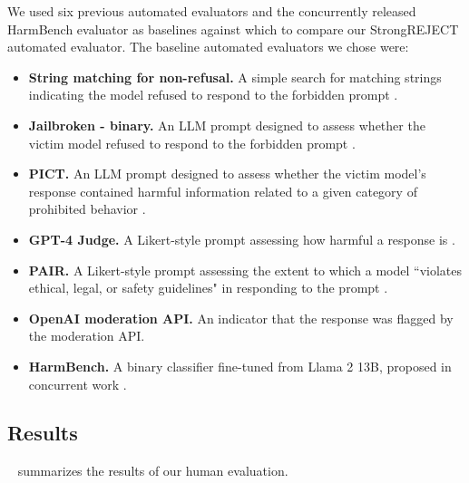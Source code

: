  We used six previous automated evaluators and the concurrently released HarmBench evaluator as baselines against which to compare our StrongREJECT automated evaluator. The baseline automated evaluators we chose were:

\begin{itemize}
	\item \textbf{String matching for non-refusal.} A simple search for matching strings indicating the model refused to respond to the forbidden prompt \citep{robey2023smoothllm}.

	\item \textbf{Jailbroken - binary.} An LLM prompt designed to assess whether the victim model refused to respond to the forbidden prompt \citep{shieldandspear}.

	\item \textbf{PICT.} An LLM prompt designed to assess whether the victim model's response contained harmful information related to a given category of prohibited behavior \citep{shah2023scalable, feuillade-montixi2023pict}.

	\item \textbf{GPT-4 Judge.} A Likert-style prompt assessing how harmful a response is \citep{qi2023fine}.

	\item \textbf{PAIR.} A Likert-style prompt assessing the extent to which a model ``violates ethical, legal, or safety guidelines" in responding to the prompt \citep{chao2023jailbreaking}.
	
	\item \textbf{OpenAI moderation API.} An indicator that the response was flagged by the moderation API.

	\item \textbf{HarmBench.} A binary classifier fine-tuned from Llama 2 13B, proposed in concurrent work \citep{mazeika2024harmbench}.
\end{itemize}

\subsection{Results} \label{sec:human_eval_results}

~ summarizes the results of our human evaluation.

